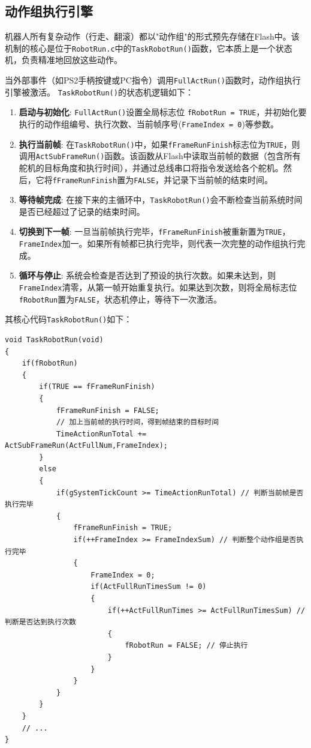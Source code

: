 \documentclass[a4paper,fontset=windows]{ctexart}
\providecommand{\tightlist}{%
  \setlength{\itemsep}{0pt}\setlength{\parskip}{0pt}}
\begin{document}
\subsection{动作组执行引擎}
机器人所有复杂动作（行走、翻滚）都以"动作组"的形式预先存储在Flash中。该机制的核心是位于\texttt{RobotRun.c}中的\texttt{TaskRobotRun()}函数，它本质上是一个状态机，负责精准地回放这些动作。

当外部事件（如PS2手柄按键或PC指令）调用\texttt{FullActRun()}函数时，动作组执行引擎被激活。
\texttt{TaskRobotRun()}的状态机逻辑如下：
\begin{enumerate}[label=\arabic*)]
    \tightlist
    \item \textbf{启动与初始化}: \texttt{FullActRun()}设置全局标志位 \texttt{fRobotRun = TRUE}，并初始化要执行的动作组编号、执行次数、当前帧序号(\texttt{FrameIndex = 0})等参数。
    \item \textbf{执行当前帧}: 在\texttt{TaskRobotRun()}中，如果\texttt{fFrameRunFinish}标志位为\texttt{TRUE}，则调用\texttt{ActSubFrameRun()}函数。该函数从Flash中读取当前帧的数据（包含所有舵机的目标角度和执行时间），并通过总线串口将指令发送给各个舵机。然后，它将\texttt{fFrameRunFinish}置为\texttt{FALSE}，并记录下当前帧的结束时间。
    \item \textbf{等待帧完成}: 在接下来的主循环中，\texttt{TaskRobotRun()}会不断检查当前系统时间是否已经超过了记录的结束时间。
    \item \textbf{切换到下一帧}: 一旦当前帧执行完毕，\texttt{fFrameRunFinish}被重新置为\texttt{TRUE}，\texttt{FrameIndex}加一。如果所有帧都已执行完毕，则代表一次完整的动作组执行完成。
    \item \textbf{循环与停止}: 系统会检查是否达到了预设的执行次数。如果未达到，则\texttt{FrameIndex}清零，从第一帧开始重复执行。如果达到次数，则将全局标志位\texttt{fRobotRun}置为\texttt{FALSE}，状态机停止，等待下一次激活。
\end{enumerate}
其核心代码\texttt{TaskRobotRun()}如下：
\begin{verbatim}
void TaskRobotRun(void)
{
	if(fRobotRun)
	{
		if(TRUE == fFrameRunFinish)
		{
			fFrameRunFinish = FALSE;
			// 加上当前帧的执行时间，得到帧结束的目标时间
			TimeActionRunTotal += ActSubFrameRun(ActFullNum,FrameIndex);
		}
		else
		{
			if(gSystemTickCount >= TimeActionRunTotal) // 判断当前帧是否执行完毕
			{
				fFrameRunFinish = TRUE;
				if(++FrameIndex >= FrameIndexSum) // 判断整个动作组是否执行完毕
				{
					FrameIndex = 0;
					if(ActFullRunTimesSum != 0)
					{
						if(++ActFullRunTimes >= ActFullRunTimesSum) // 判断是否达到执行次数
						{
							fRobotRun = FALSE; // 停止执行
						}
					}
				}
			}
		}
	}
    // ...
}
\end{verbatim}
\end{document}
